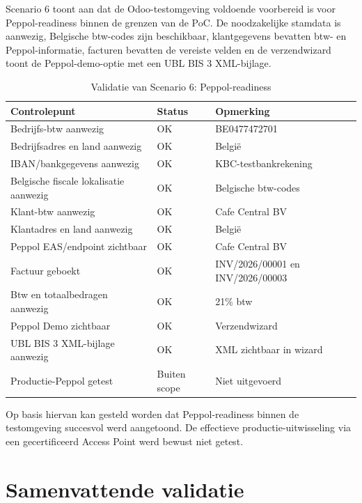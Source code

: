Scenario 6 toont aan dat de Odoo-testomgeving voldoende voorbereid is voor Peppol-readiness binnen de grenzen van de PoC. De noodzakelijke stamdata is aanwezig, Belgische btw-codes zijn beschikbaar, klantgegevens bevatten btw- en Peppol-informatie, facturen bevatten de vereiste velden en de verzendwizard toont de Peppol-demo-optie met een UBL BIS 3 XML-bijlage.

\begin{table}[H]
    \centering
    \caption{Validatie van Scenario 6: Peppol-readiness}
    \label{tab:poc-s6}
    \begin{tabular}{p{}p{}p{}}
        \toprule
        \textbf{Controlepunt} & \textbf{Status} & \textbf{Opmerking} \\
        \midrule
        Bedrijfs-btw aanwezig & OK & BE0477472701 \\
        Bedrijfsadres en land aanwezig & OK & België \\
        IBAN/bankgegevens aanwezig & OK & KBC-testbankrekening \\
        Belgische fiscale lokalisatie aanwezig & OK & Belgische btw-codes \\
        Klant-btw aanwezig & OK & Cafe Central BV \\
        Klantadres en land aanwezig & OK & België \\
        Peppol EAS/endpoint zichtbaar & OK & Cafe Central BV \\
        Factuur geboekt & OK & INV/2026/00001 en INV/2026/00003 \\
        Btw en totaalbedragen aanwezig & OK & 21\% btw \\
        Peppol Demo zichtbaar & OK & Verzendwizard \\
        UBL BIS 3 XML-bijlage aanwezig & OK & XML zichtbaar in wizard \\
        Productie-Peppol getest & Buiten scope & Niet uitgevoerd \\
        \bottomrule
    \end{tabular}
\end{table}

Op basis hiervan kan gesteld worden dat Peppol-readiness binnen de testomgeving succesvol werd aangetoond. De effectieve productie-uitwisseling via een gecertificeerd Access Point werd bewust niet getest.

\section{Samenvattende validatie}
\label{sec:poc-samenvatting}


